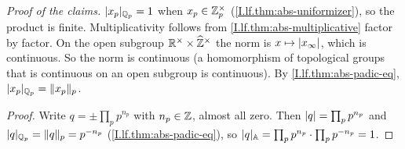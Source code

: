 \begin{definition}
\end{definition}
\noindent\emph{Proof of the claims.} $\lvert x_p\rvert_{\mathbb{Q}_p}=1$ when $x_p\in\mathbb{Z}_p^\times$ (\cref{I.lf.thm:abs-uniformizer}), so
the product is finite. Multiplicativity follows from \cref{I.lf.thm:abs-multiplicative} factor by factor. On the open
subgroup $\mathbb{R}^\times\times\widehat{\mathbb{Z}}^\times$ the norm is $x\mapsto\lvert x_\infty\rvert$, which is continuous. So the norm is
continuous (a homomorphism of topological groups that is continuous on an open subgroup is continuous). By \cref{I.lf.thm:abs-padic-eq},
$\lvert x_p\rvert_{\mathbb{Q}_p}=\lVert x_p\rVert_p$.

\begin{theorem}
\end{theorem}
\begin{proof}
Write $q=\pm\prod_pp^{n_p}$ with $n_p\in\mathbb{Z}$, almost all zero. Then $\lvert q\rvert=\prod_pp^{n_p}$ and
$\lvert q\rvert_{\mathbb{Q}_p}=\lVert q\rVert_p=p^{-n_p}$ (\cref{I.lf.thm:abs-padic-eq}), so $\lvert q\rvert_{\mathbb{A}}=\prod_pp^{n_p}\cdot\prod_pp^{-n_p}=1$.
\end{proof}

